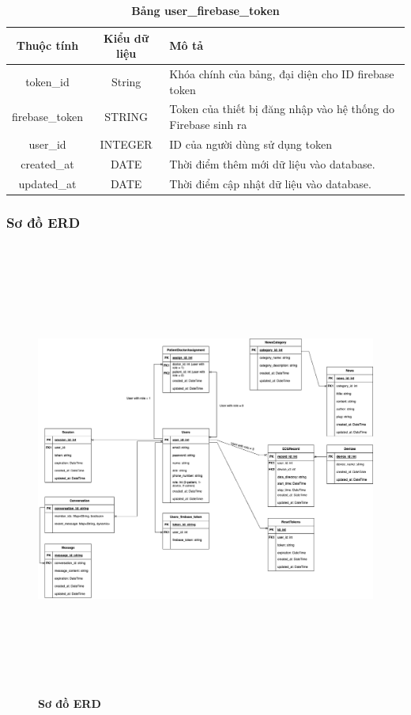 \begin{table}[H]
  \caption{\bfseries \fontsize{12pt}{0pt}\selectfont Bảng user\_firebase\_token}
  \centering
  \begin{tabularx}{0.9\textwidth}{|c|c|X|}
    \hline
    \textbf{Thuộc tính} & \textbf{Kiểu dữ liệu} & \textbf{Mô tả} \\
    \hline
    token\_id & String & Khóa chính của bảng, đại diện cho ID firebase token \\
    \hline
    firebase\_token & STRING & Token của thiết bị đăng nhập vào hệ thống do Firebase sinh ra \\
    \hline
    user\_id & INTEGER & ID của người dùng sử dụng token \\
    \hline
    created\_at & DATE & Thời điểm thêm mới dữ liệu vào database. \\
    \hline
    updated\_at & DATE & Thời điểm cập nhật dữ liệu vào database. \\
    \hline
  \end{tabularx}
\end{table}

\subsubsection{Sơ đồ ERD}

\begin{figure}[H]
  \centering
  \includegraphics[width=15cm,height=15cm]{Images/system/fmECG_database.png}
  \caption[Sơ đồ ERD]{\bfseries \fontsize{12pt}{0pt}\selectfont Sơ đồ ERD}
  \label{fmECG_architecture-Database} %
\end{figure}

